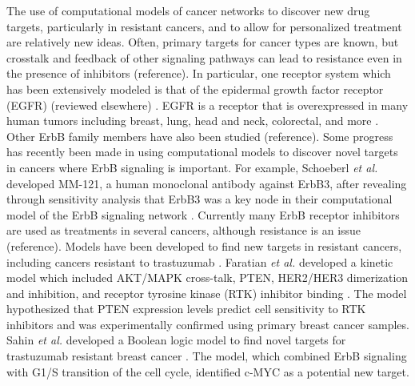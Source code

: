 \documentclass[12pt]{article}
\begin{document}
The use of computational models of cancer networks to discover new drug targets, particularly in resistant cancers, and to allow for personalized treatment are relatively new ideas. Often, primary targets for cancer types are known, but crosstalk and feedback of other signaling pathways can lead to resistance even in the presence of inhibitors (reference). In particular, one receptor system which has been extensively modeled is that of the epidermal growth factor receptor (EGFR) (reviewed elsewhere) \cite{Wiley2003}. EGFR is a receptor that is overexpressed in many human tumors including breast, lung, head and neck, colorectal, and more \cite{Salomon1995}. Other ErbB family members have also been studied (reference). Some progress has recently been made in using computational models to discover novel targets in cancers where ErbB signaling is important. For example, Schoeberl \textit{et al.} developed MM-121, a human monoclonal antibody against ErbB3, after revealing through sensitivity analysis that ErbB3 was a key node in their computational model of the ErbB signaling network \cite{Schoeberl2009}. Currently many ErbB receptor inhibitors are used as treatments in several cancers, although resistance is an issue (reference). Models have been developed to find new targets in resistant cancers, including cancers resistant to trastuzumab \cite{Faratian2009,Sahin2009}. Faratian \textit{et al.} developed a kinetic model which included AKT/MAPK cross-talk, PTEN, HER2/HER3 dimerization and inhibition, and receptor tyrosine kinase (RTK) inhibitor binding \cite{Faratian2009}. The model hypothesized that PTEN expression levels predict cell sensitivity to RTK inhibitors and was experimentally confirmed using primary breast cancer samples. Sahin \textit{et al.} developed a Boolean logic model to find novel targets for trastuzumab resistant breast cancer \cite{Sahin2009}. The model, which combined ErbB signaling with G1/S transition of the cell cycle, identified c-MYC as a potential new target. 
\end{document}
